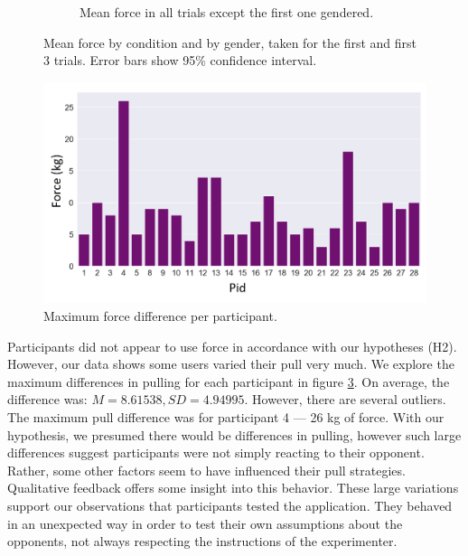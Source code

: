 \begin{figure}[H]
\begin{subfigure}[b]{0.5\textwidth}
     \vspace{-5mm}
     \caption{Mean force in all trials except the first one  gendered.}
     \vspace{-5mm}
     \label{fig:meanFRestGen}
 \end{subfigure}
 \vspace{1mm}
     \caption{Mean force by condition and by gender, taken for the first and first 3 trials. Error bars show 95\%  confidence interval.}
    \label{fig:forceIn1stRest}
\end{figure}
\begin{figure}[H]
\hspace{-10mm}
 \captionsetup{justification=centering,margin=0.1cm}
 \centering
 \includegraphics[width=\linewidth]{Files/Plots/max_force_dif.png}
 \caption{Maximum force difference per participant.}
\label{fig:forceDif}
\end{figure} 
Participants did not appear to use force in accordance with our hypotheses (H2). However, our data shows some users varied their pull very much.
We explore the maximum differences in pulling for each participant in figure \ref{fig:forceDif}. On average, the difference was: $M=8.61538, SD=4.94995$. However, there are several outliers. The maximum pull difference was for participant 4 --- 26 kg of force. With our hypothesis, we presumed there would be differences in pulling, however such large differences suggest participants were not simply reacting to their opponent. Rather, some other factors seem to have influenced their pull strategies. Qualitative feedback offers some insight into this behavior. These large variations support our observations that participants tested the application. They behaved in an unexpected way in order to test their own assumptions about the opponents, not always respecting the instructions of the experimenter.\\
